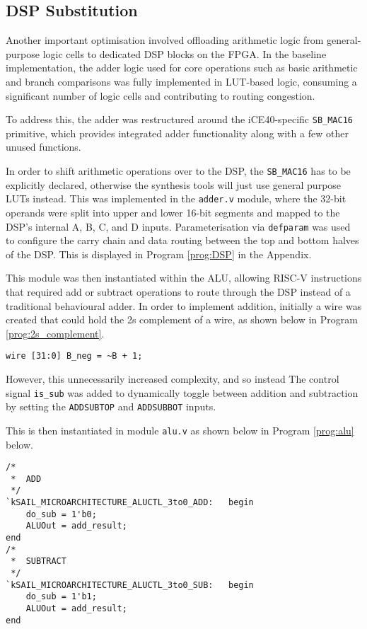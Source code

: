 \documentclass[a4paper,10pt]{article}
\begin{document}
\subsection{DSP Substitution}
\label{sec:DSP}

Another important optimisation involved offloading arithmetic logic 
from general-purpose logic cells to dedicated DSP blocks on the FPGA. 
In the baseline implementation, the adder logic used for core operations 
such as basic arithmetic and branch comparisons was fully implemented in LUT-based logic, 
consuming a significant number of logic cells and contributing to routing congestion. 

To address this, the adder was restructured around 
the iCE40-specific \texttt{SB\_MAC16} primitive, 
which provides integrated adder functionality
along with a few other unused functions. 

In order to shift arithmetic operations over to the DSP,
the \texttt{SB\_MAC16} has to be explicitly declared,
otherwise the synthesis tools will just use general purpose LUTs instead.
This was implemented in the \texttt{adder.v} module, 
where the 32-bit operands were split into upper and lower 16-bit segments 
and mapped to the DSP's internal A, B, C, and D inputs. 
Parameterisation via \texttt{defparam} was used to configure the carry chain 
and data routing between the top and bottom halves of the DSP.
This is displayed in Program \ref{prog:DSP} in the Appendix.

This module was then instantiated within the ALU, allowing RISC-V instructions 
that required add or subtract operations to route through the DSP instead 
of a traditional behavioural adder. 
In order to implement addition, initially a wire was created that could
hold the 2s complement of a wire, as shown below in Program \ref{prog:2s_complement}.

\begin{lstlisting}[style=verilog-style, caption=
    {2s compliment}, label={prog:2s_complement}]
wire [31:0] B_neg = ~B + 1;
\end{lstlisting}

However, this unnecessarily increased complexity, and so instead
The control signal \texttt{is\_sub} was added to dynamically toggle between 
addition and subtraction by setting the 
\texttt{ADDSUBTOP} and \texttt{ADDSUBBOT} inputs. 

This is then instantiated in module \texttt{alu.v}
as shown below in Program \ref{prog:alu} below.

\begin{lstlisting}[style=verilog-style, caption=
    {is\_sub implementation within alu.v}, label={prog:alu}]
/*
 *	ADD
 */
`kSAIL_MICROARCHITECTURE_ALUCTL_3to0_ADD:	begin
	do_sub = 1'b0;
	ALUOut = add_result;
end
/*
 *	SUBTRACT
 */
`kSAIL_MICROARCHITECTURE_ALUCTL_3to0_SUB:	begin
	do_sub = 1'b1;
	ALUOut = add_result;
end
\end{lstlisting}
\end{document}
